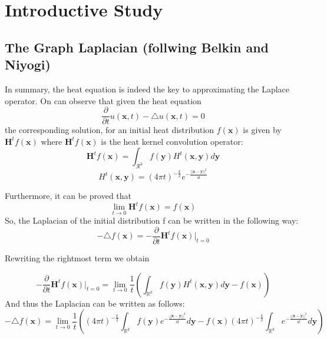 

\setcounter{page}{1}
\graphicspath{{Figs/LiteratureReview}}



\section {Introductive Study} 

\subsection{The Graph Laplacian (follwing Belkin and Niyogi)}
In summary, the heat equation is indeed the key to approximating the Laplace operator. On can observe that given the heat equation 
\begin{equation}
\frac{\partial}{\partial t}u(\mathbf x, t)-\triangle u(\mathbf x, t) = 0
\end{equation}
the corresponding solution, for an initial heat distribution $f(\mathbf x)$ is given by $\mathbf{H}^t f(\mathbf x) $
where $\mathbf{H}^t f(\mathbf x)$ is the heat kernel convolution operator:
$$\mathbf{H}^t f(\mathbf x) = \int_{\mathcal R^k}f(\mathbf y)H^t(\mathbf x, \mathbf y) d\mathbf y$$
$$H^t(\mathbf x, \mathbf y)  = (4\pi t)^{-\frac{k}{2}}e^{-\frac{||\mathbf x - \mathbf y||^2}{4t}}$$

Furthermore, it can be proved that 
$$\lim_{t\rightarrow 0} \mathbf{H}^t f(\mathbf x) = f(\mathbf x) $$
So, the Laplacian of the initial distribution f can be written in the following way:
\begin{equation}
-\triangle f(\mathbf x) = -\frac{\partial}{\partial t}\mathbf{H}^t f(\mathbf x) |_{t=0}
\end{equation}

Rewriting the rightmost term we obtain

$$-\frac{\partial}{\partial t}\mathbf{H}^t f(\mathbf x) |_{t=0}  = \lim_{t\rightarrow 0} \frac{1}{t}\left( \int_{\mathbb R^k}f(\mathbf y)H^t(\mathbf x, \mathbf y)d\mathbf y - f(\mathbf x)\right)$$
And thus the Laplacian can be written as follows:
$$-\triangle f(\mathbf x) = \lim_{t\rightarrow 0} \frac{1}{t}\left((4\pi t)^{-\frac{k}{2}} \int_{\mathbb R^k}f(\mathbf y)e^{-\frac{||\mathbf x - \mathbf y||^2}{4t}}d\mathbf y - f(\mathbf x)(4\pi t)^{-\frac{k}{2}} \int_{\mathbb R^k} e^{-\frac{||\mathbf x - \mathbf y||^2}{4t}}d\mathbf y \right)$$

